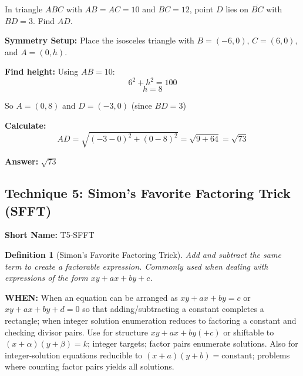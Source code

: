 \documentclass[12pt]{article}
\newtheorem{definition}{Definition}[section]
\newenvironment{problem}[1]
{\begin{tcolorbox}[colback=blue!5!white,colframe=blue!75!black,title={#1}]}{\end{tcolorbox}}
\newenvironment{solution}
{\begin{tcolorbox}[colback=green!5!white,colframe=green!75!black,title={Solution}]}{\end{tcolorbox}}
\begin{document}
\begin{problem}{AMC 12B 2019, Problem 16}
In triangle $ABC$ with $AB = AC = 10$ and $BC = 12$, point $D$ lies on $\overline{BC}$ with $BD = 3$. Find $AD$.
\end{problem}

\begin{solution}
\textbf{Symmetry Setup:} Place the isosceles triangle with $B = (-6, 0)$, $C = (6, 0)$, and $A = (0, h)$.

\begin{center}
\end{center}

\textbf{Find height:} Using $AB = 10$:
$$6^2 + h^2 = 100$$
$$h = 8$$

So $A = (0, 8)$ and $D = (-3, 0)$ (since $BD = 3$)

\textbf{Calculate:} 
$$AD = \sqrt{(-3-0)^2 + (0-8)^2} = \sqrt{9 + 64} = \sqrt{73}$$

\textbf{Answer:} $\sqrt{73}$
\end{solution}

\subsection{Technique 5: Simon's Favorite Factoring Trick (SFFT)}
\textbf{Short Name:} T5-SFFT

\begin{definition}[Simon's Favorite Factoring Trick]
Add and subtract the same term to create a factorable expression. Commonly used when dealing with expressions of the form $xy + ax + by + c$.
\end{definition}

\textbf{WHEN:} When an equation can be arranged as \(xy+ax+by=c\) or \(xy+ax+by+d=0\) so that adding/subtracting a constant completes a rectangle; when integer solution enumeration reduces to factoring a constant and checking divisor pairs. Use for structure $xy+ax+by(+c)$ or shiftable to $(x+\alpha)(y+\beta)=k$; integer targets; factor pairs enumerate solutions. Also for integer-solution equations reducible to \((x+a)(y+b)=\text{constant}\); problems where counting factor pairs yields all solutions.
\end{document}
